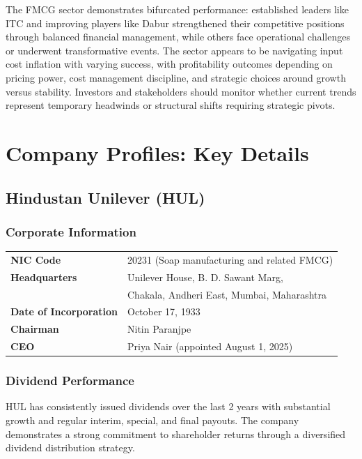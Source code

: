 \documentclass[12pt, a4paper]{report}
\begin{document}
The FMCG sector demonstrates bifurcated performance: established leaders like ITC and improving players like Dabur strengthened their competitive positions through balanced financial management, while others face operational challenges or underwent transformative events. The sector appears to be navigating input cost inflation with varying success, with profitability outcomes depending on pricing power, cost management discipline, and strategic choices around growth versus stability. Investors and stakeholders should monitor whether current trends represent temporary headwinds or structural shifts requiring strategic pivots.

\newpage

\chapter{Company Profiles: Key Details}

\section{Hindustan Unilever (HUL)}

\subsection{Corporate Information}

\begin{tabular}{ll}
    \textbf{NIC Code} & 20231 (Soap manufacturing and related FMCG) \\
    \textbf{Headquarters} & Unilever House, B. D. Sawant Marg, \\
                          & Chakala, Andheri East, Mumbai, Maharashtra \\
    \textbf{Date of Incorporation} & October 17, 1933 \\
    \textbf{Chairman} & Nitin Paranjpe \\
    \textbf{CEO} & Priya Nair (appointed August 1, 2025) \\
\end{tabular}

\subsection{Dividend Performance}

HUL has consistently issued dividends over the last 2 years with substantial growth and regular interim, special, and final payouts. The company demonstrates a strong commitment to shareholder returns through a diversified dividend distribution strategy.
\end{document}
